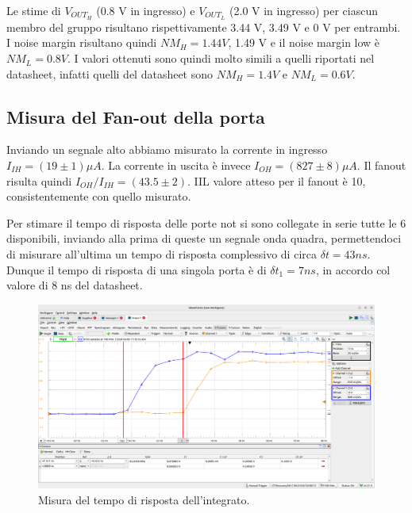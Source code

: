 \documentclass[10pt,a4paper]{article}
\begin{document}
Le stime di $V_{OUT_H}$ (0.8 V in ingresso) e $V_{OUT_L}$ (2.0 V in ingresso) per ciascun membro del gruppo risultano rispettivamente 3.44 V, 3.49 V e 0 V per entrambi. I noise margin risultano quindi $NM_H = 1.44 V$, 1.49 V e il noise margin low è $NM_L = 0.8 V$. I valori ottenuti sono quindi molto simili a quelli riportati nel datasheet, infatti quelli del datasheet sono $NM_H = 1.4 V$ e $NM_L = 0.6 V$.

\subsection*{Misura del Fan-out della porta}
Inviando un segnale alto abbiamo misurato la corrente in ingresso $I_{IH} = (19 \pm 1) \mu A$. La corrente in uscita è invece $I_{OH} = (827 \pm 8) \mu A$. Il fanout risulta quindi $I_{OH}/I_{IH} = (43.5 \pm 2)$. IIL valore atteso per il fanout è 10, consistentemente con quello misurato.


Per stimare il tempo di risposta delle porte not si sono collegate in serie tutte le 6 disponibili, inviando alla prima di queste un segnale onda quadra, permettendoci di misurare all'ultima un tempo di risposta complessivo di circa $\delta t = 43 ns$. Dunque il tempo di risposta di una singola porta è di $\delta t_1 = 7 ns$, in accordo col valore di 8 ns del datasheet.

\begin{figure}[htp]
    \begin{center}
    \includegraphics[scale=0.25]{fig3.png}
    \caption{Misura del tempo di risposta dell'integrato.}
    \label{fig3}
    \end{center}
\end{figure}
\end{document}
